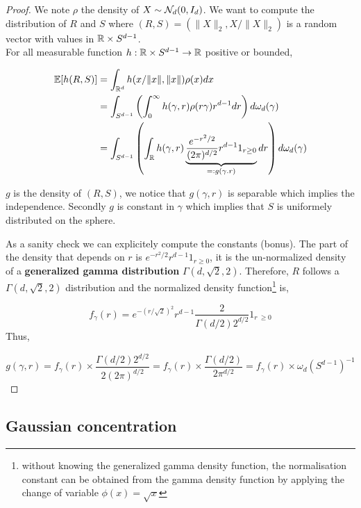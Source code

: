 \documentclass{article}
\begin{document}
\begin{proof}
  We note $\rho$ the density of $X \sim \mathcal{N}_d(0,I_d)$. We want to compute the
  distribution of $R$ and $S$ where $(R,S) = (\|X\|_2,X/\|X\|_2)$ is a random
  vector with values in $\mathbb{R} \times S^{d-1}$. \\ For all measurable function
  $h:\mathbb{R} \times S^{d-1} \to \mathbb{R}$ positive or bounded, 

\begin{equation}
\begin{aligned}
  \mathbb{E}[h(R,S)] &= \int_{\mathbb{R}^{d}} h(x/\|x\|,\|x\|)\rho(x) d x \\  &= \int_{S^{d-1}}\left(\int_{0}^{\infty} h(\gamma,r) \rho(r\gamma) r^{d-1} d r\right) d \omega_d(\gamma) \\
  &= \int_{S^{d-1}}\left(\int_{\mathbb{R}} h(\gamma,r) \underbrace{\frac{e^{-r^2/2}}{(2\pi)^{d/2}} r^{d-1}1_{r \geq 0}}_{=: g(\gamma.r)} d r\right) d \omega_d(\gamma)
\end{aligned}
\end{equation}

$g$ is the density of $(R,S)$, we notice that $g(\gamma,r)$ is separable which
implies the independence. Secondly $g$ is constant in $\gamma$ which implies
that $S$ is uniformely distributed on the sphere.

As a sanity check we can explicitely compute the constants (bonus). The part of
the density that depends on $r$ is $e^{-r^2/2} r^{d-1}1_{r \geq 0}$, it is the un-normalized
density of a \textbf{generalized gamma distribution} $\Gamma(d,\sqrt{2},2)$.
Therefore, $R$ follows a $\Gamma(d,\sqrt{2},2)$ distribution and the normalized
density function\footnote{without knowing the generalized gamma density function, the
  normalisation constant can be obtained from the gamma density
  function by applying the change of variable $\phi(x) = \sqrt{x}$} is,

$$f_{\gamma}(r) = e^{-(r/\sqrt{2})^2} r^{d-1} \frac{2}{\Gamma(d/2)2^{d/2}}1_{r\
  \geq 0}$$
Thus,

$$ g(\gamma,r) = f_{\gamma}(r) \times \frac{\Gamma(d/2)2^{d/2}}{2(2\pi)^{d/2}} = f_{\gamma}(r) \times \frac{\Gamma(d/2)}{2\pi^{d/2}} = f_{\gamma}(r) \times \omega_d(S^{d-1})^{-1}$$

\end{proof}

\subsection{Gaussian concentration}
\end{document}

